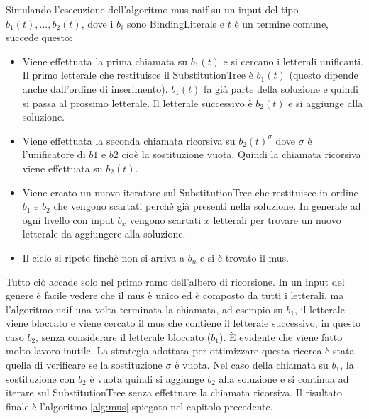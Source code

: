 \documentclass[./main.tex]{subfiles}
\begin{document}
Simulando l'esecuzione dell'algoritmo mus naif su un input del tipo $b_1(t), ..., b_2(t)$, dove i 
$b_i$ sono BindingLiterals e $t$ è un termine comune, succede questo:
\begin{itemize}
    \item Viene effettuata la prima chiamata su $b_1(t)$ e si cercano i letterali unificanti.
    Il primo letterale che restituisce il SubstitutionTree è $b_1(t)$ (questo dipende anche dall'ordine di inserimento).
    $b_1(t)$ fa già parte della soluzione e quindi si passa al prossimo letterale.
    Il letterale successivo è $b_2(t)$ e si aggiunge alla soluzione.
    \item Viene effettuata la seconda chiamata ricorsiva su $b_2(t)^\sigma$ dove $\sigma$ è l'unificatore
    di $b1$ e $b2$ cioè la sostituzione vuota. Quindi la chiamata ricorsiva viene effettuata su $b_2(t)$.
    \item Viene creato un nuovo iteratore sul SubstitutionTree che restituisce in ordine 
    $b_1$ e $b_2$ che vengono scartati perchè già presenti nella soluzione.
    In generale ad ogni livello con input $b_x$ vengono scartati $x$ letterali per trovare un nuovo
    letterale da aggiungere alla soluzione.
    \item Il ciclo si ripete finchè non si arriva a $b_n$ e si è trovato il mus.
\end{itemize}
Tutto ciò accade solo nel primo ramo dell'albero di ricorsione.
In un input del genere è facile vedere che il mus è unico ed è composto da tutti i letterali,
ma l'algoritmo naif una volta terminata la chiamata, ad esempio su $b_1$, il letterale viene bloccato
e viene cercato il mus che contiene il letterale successivo, in questo caso $b_2$, senza considerare il letterale bloccato ($b_1$).
È evidente che viene fatto molto lavoro inutile.
La strategia adottata per ottimizzare questa ricerca è stata quella di verificare se la sostituzione $\sigma$ è vuota.
Nel caso della chiamata su $b_1$, la sostituzione con $b_2$ è vuota quindi si aggiunge $b_2$ alla soluzione e si 
continua ad iterare sul SubstitutionTree senza effettuare la chiamata ricorsiva.
Il risultato finale è l'algoritmo \ref{alg:mus} spiegato nel capitolo precedente.
\end{document}
